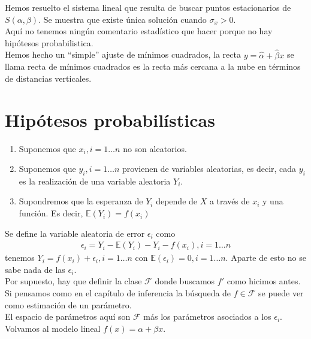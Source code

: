 \documentclass[10pt]{article}
\theoremstyle{plain}
\theoremstyle{definition}
\begin{document}
Hemos resuelto el sistema lineal que resulta de buscar puntos estacionarios de $S(\alpha, \beta)$. Se muestra que existe única solución cuando $\sigma_{x}>0$.\\

Aquí no tenemos ningún comentario estadístico que hacer porque no hay hipótesos probabilistica.\\

Hemos hecho un ``simple'' ajuste de mínimos cuadrados, la recta $y = \hat{\alpha} + \hat{\beta}x$ se llama recta de mínimos cuadrados es la recta más cercana a la nube en términos de distancias verticales.

\section{Hipótesos probabilísticas}
\begin{enumerate}
\item Suponemos que $x_{i}, i = 1\ldots n$ no son aleatorios.
\item Suponemos que $y_{i}, i = 1\ldots n$ provienen de variables aleatorias, es decir, cada $y_{i}$ es la realización de una variable aleatoria $Y_{i}$.
\item Supondremos que la esperanza de $Y_{i}$ depende de $X$ a través de $x_{i}$ y una función. Es decir, $\mathbb{E}(Y_{i}) = f(x_{i})$
\end{enumerate}
Se define la variable aleatoria de error $\epsilon_{i}$ como
\begin{align*}
\epsilon_{i} = Y_{i} - \mathbb{E}(Y_{i}) - Y_{i} - f(x_{i}),i = 1\ldots n
\end{align*}
tenemos $Y_{i} = f(x_{i}) + \epsilon_{i}, i = 1\ldots n$ con $\mathbb{E}(\epsilon_{i}) = 0, i = 1\ldots n$. Aparte de esto no se sabe nada de las $\epsilon_{i}$.\\

Por supuesto, hay que definir la clase $\mathcal{F}$ donde buscamos $f'$ como hicimos antes.\\

Si pensamos como en el capítulo de inferencia la búsqueda de $f\in \mathcal{F}$ se puede ver como estimación de un parámetro.\\

El espacio de parámetros aquí son $\mathcal{F}$ más los parámetros asociados a los $\epsilon_{i}$.\\

Volvamos al modelo lineal $f(x) = \alpha + \beta x$.\\
\end{document}
